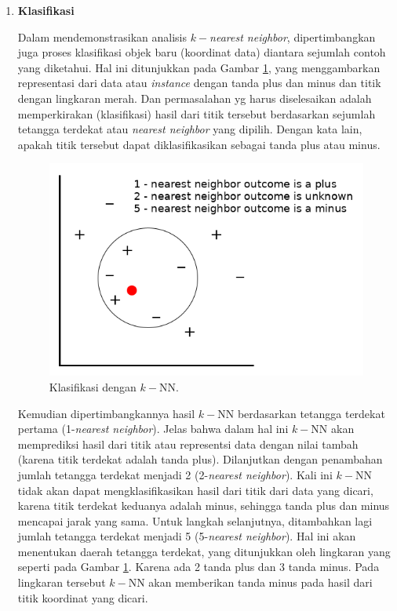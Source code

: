 \begin{enumerate}[label=\textbf{\alph*).}]
	
	\item \textbf{Klasifikasi}
	\setlength{\parindent}{0.8cm}
	
	Dalam mendemonstrasikan analisis $k-$\textit{nearest neighbor}, dipertimbangkan juga proses klasifikasi objek baru (koordinat data) diantara sejumlah contoh yang diketahui. Hal ini ditunjukkan pada Gambar \ref{fig:k-nn_plus_minus}, yang menggambarkan representasi dari data atau \textit{instance} dengan tanda plus dan minus dan titik dengan lingkaran merah. Dan permasalahan yg harus diselesaikan adalah memperkirakan (klasifikasi) hasil dari titik tersebut berdasarkan sejumlah tetangga terdekat atau \textit{nearest neighbor} yang dipilih. Dengan kata lain, apakah titik tersebut dapat diklasifikasikan sebagai tanda plus atau minus.
	
	\begin{figure} [!h] \centering
		\includegraphics[scale=0.45]{img/k-nn_plus_minus.png}
		\caption{Klasifikasi dengan $k-$NN.}
		\label{fig:k-nn_plus_minus}
	\end{figure}
	
	Kemudian dipertimbangkannya hasil $k-$NN berdasarkan tetangga terdekat pertama (1-\textit{nearest neighbor}). Jelas bahwa dalam hal ini $k-$NN akan memprediksi hasil dari titik atau representsi data dengan nilai tambah (karena titik terdekat adalah tanda plus). Dilanjutkan dengan penambahan jumlah tetangga terdekat menjadi 2 (2-\textit{nearest neighbor}). Kali ini $k-$NN tidak akan dapat mengklasifikasikan hasil dari titik dari data yang dicari, karena titik terdekat keduanya adalah minus, sehingga tanda plus dan minus mencapai jarak yang sama. Untuk langkah selanjutnya, ditambahkan lagi jumlah tetangga terdekat menjadi 5 (5-\textit{nearest neighbor}). Hal ini akan menentukan daerah tetangga terdekat, yang ditunjukkan oleh lingkaran yang seperti pada Gambar \ref{fig:k-nn_plus_minus}. Karena ada 2 tanda plus dan 3 tanda minus. Pada lingkaran tersebut $k-$NN akan memberikan tanda minus pada hasil dari titik koordinat yang dicari.
	

\end{enumerate}
